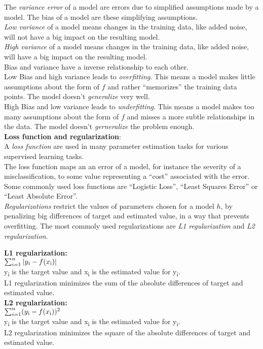 The \emph{variance error} of a model are errors due to simplified assumptions made by a model. The bias of a model are these simplifying assumptions. 
\\
\emph{Low variance} of a model means changes in the training data, like added noise, will not have a big impact on the resulting model.
\\
\emph{High variance} of a model means changes in the training data, like added noise, will have a big impact on the resulting model.
\\

Bias and variance have a inverse relationship to each other.\\
Low Bias and high variance leads to \emph{overfitting}. This means a model makes little assumptions about the form of $f$ and rather ``memorizes'' the training data points. The model doesn't \emph{generalize} very well.
\\
High Bias and low variance leads to \emph{underfitting}. This means a model makes too many assumptions about the form of $f$ and misses a more subtle relationships in the data. The model doesn't \emph{gerneralize} the problem enough.
\\

\textbf{Loss function and regularization}: \\
A \emph{loss function} are used in many parameter estimation tasks for various supervised learning tasks.
\\
The loss function maps an an error of a model, for instance the severity of a misclassification, to some value representing a ``cost'' associated with the error.
\\
Some commonly used loss functions are ``Logistic Loss'', ``Least Squares Error'' or ``Least Absolute Error''.
\\

\emph{Regularizations} restrict the values of parameters chosen for a model $h$, by penalizing big differences of target and estimated value,  in a way that prevents overfitting. The most commoly used regularizations are \emph{L1 regularization} and \emph{L2 regularization}.

\textbf{L1 regularization:}\\
$\sum_{i=1}^{n}|y\textsubscript{i}-f(x\textsubscript{i})| $ \\
 y\textsubscript{i} is the target value and x\textsubscript{i} is the estimated value for y\textsubscript{i}.\\
 L1 regularization minimizes the sum of the absolute differences of target and estimated value.
\\
\textbf{L2 regularization:}  \\
$\sum_{i=1}^{n}(y\textsubscript{i}-f(x\textsubscript{i}))^2 $ \\
 y\textsubscript{i} is the target value and x\textsubscript{i} is the estimated value for y\textsubscript{i}.\\
 L2 regularization minimizes the square of the absolute differences of target and estimated value.
\\

